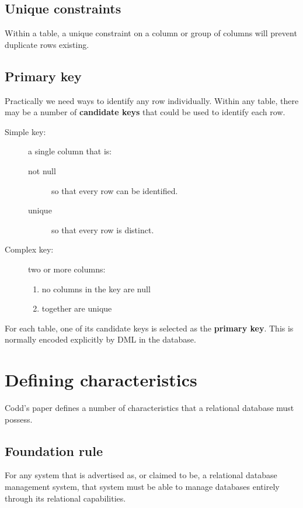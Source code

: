 \subsection{Unique constraints}

Within a table, a unique constraint on a column or group of columns will prevent duplicate rows existing.  

\subsection{Primary key}

Practically we need ways to identify any row individually.
Within any table, there may be a number of \textbf{candidate keys} that could be used to identify each row.
\begin{description}
\item[Simple key:] a single column that is:
  \begin{description}
  \item[not null] so that every row can be identified.
  \item[unique] so that every row is distinct. 
  \end{description}
\item[Complex key:] two or more columns:
  \begin{enumerate}
  \item no columns in the key are null
  \item together are unique
  \end{enumerate}
\end{description}
For each table, one of its candidate keys is selected as the \textbf{primary key}.
This is normally encoded explicitly by DML in the database.


\section{Defining characteristics}

Codd's paper defines a number of characteristics that a relational database must possess.

\subsection{Foundation rule}
  For any system that is advertised as, or claimed to be, a relational database management system, that system must be able to manage databases entirely through its relational capabilities.
  
